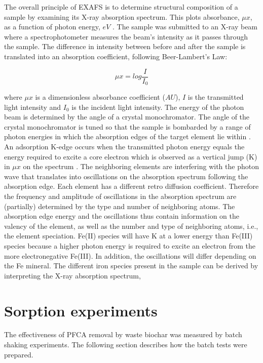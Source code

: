 The overall principle of EXAFS is to determine structural composition of a sample by examining its X-ray absorption spectrum. This plots absorbance, $\mu x$, as a function of photon energy, $eV$ \citep{vlaica2004exafs}. The sample was submitted to an X-ray beam where a spectrophotometer measures the beam's intensity as it passes through the sample. The difference in intensity between before and after the sample is translated into an absorption coefficient, following Beer-Lambert's Law: 

\begin{equation}\label{eq:absorbance}
    \mu x = log \frac{I}{I_0}
\end{equation}

where $\mu x$ is a dimensionless absorbance coefficient ($AU$), $I$ is the transmitted light intensity and $I_0$ is the incident light intensity. The energy of the photon beam is determined by the angle of a crystal monochromator. The angle of the crystal monochromator is tuned so that the sample is bombarded by a range of photon energies in which the absorption edges of the target element lie within \citep{vlaica2004exafs}. An adsorption K-edge occurs when the transmitted photon energy equals the energy required to excite a core electron which is observed as a vertical jump (K) in $\mu x$ on the spectrum \citep{vlaica2004exafs}. The neighboring elements are interfering with the photon wave that translates into oscillations on the absorption spectrum following the absorption edge. Each element has a different retro diffusion coefficient. Therefore the frequency and amplitude of oscillations in the absorption spectrum are (partially) determined by the type and number of neighboring atoms. The absorption edge energy and the oscillations thus contain information on the valency of the element, as well as the number and type of neighboring atoms, i.e., the element speciation. Fe(II) species will have K at a lower energy than Fe(III) species because a higher photon energy is required to excite an electron from the more electronegative Fe(III). In addition, the oscillations will differ depending on the Fe mineral. The different iron species present in the sample can be derived by interpreting the X-ray absorption spectrum, 


\section{Sorption experiments}
The effectiveness of PFCA removal by waste biochar was measured by batch shaking experiments. The following section describes how the batch tests were prepared.

